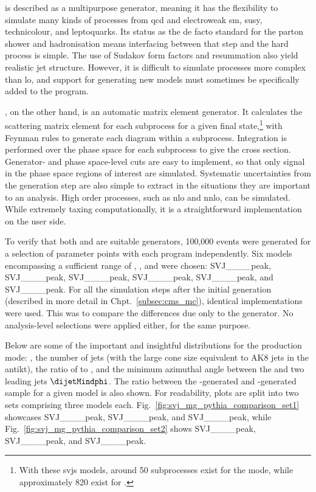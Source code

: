 
\PYTHIAEIGHT is described as a multipurpose generator, meaning it has the flexibility to simulate many kinds of processes from \acrshort{qcd} and electroweak \acrshort{sm}, \acrshort{susy}, technicolour, and leptoquarks. Its status as the de facto standard for the parton shower and hadronisation means interfacing between that step and the hard process is simple. The use of Sudakov form factors and resummation also yield realistic jet structure. However, it is difficult to simulate processes more complex than \acrshort{lo}, and support for generating new models must sometimes be specifically added to the program.

\MGvATNLO, on the other hand, is an automatic matrix element generator. It calculates the scattering matrix element for each subprocess for a given final state,\footnote{With these \glspl{svj} models, around 50 subprocesses exist for the \schannel mode, while approximately 820 exist for \tchannel.} with Feynman rules to generate each diagram within a subprocess. Integration is performed over the phase space for each subprocess to give the cross section. Generator- and phase space-level cuts are easy to implement, so that only signal in the phase space regions of interest are simulated. Systematic uncertainties from the generation step are also simple to extract in the situations they are important to an analysis. High order processes, such as \acrshort{nlo} and \acrshort{nnlo}, can be simulated. While extremely taxing computationally, it is a straightforward implementation on the user side.

To verify that both \PYTHIA and \MADGRAPH are suitable generators, 100,000 events were generated for a selection of parameter points with each program independently. Six models encompassing a sufficient range of \mZprime, \mDark, and \rinv were chosen: SVJ\_\_\_\_\-peak, SVJ\_\_\_\_peak, SVJ\_\_\_\_\-peak, SVJ\_\_\_\_\-peak, SVJ\_\_\_\_\-peak, and SVJ\_\_\_\_\-peak. For all the simulation steps after the initial generation (described in more detail in Chpt.~\ref{subsec:cms_mc}), identical implementations were used. This was to compare the differences due only to the generator. No analysis-level selections were applied either, for the same purpose.

Below are some of the important and insightful distributions for the \schannel production mode: \mT, the number of \glspl{jet} (with the large cone size equivalent to AK8 \glspl{jet} in the \gls{antikt}), the ratio of \ptmiss to \mT, and the minimum azimuthal angle between the \ptmiss and two leading \glspl{jet} $\dijetMindphi$. The ratio between the \MADGRAPH-generated and \PYTHIA-generated sample for a given model is also shown. For readability, plots are split into two sets comprising three models each. Fig.~\ref{fig:svj_mg_pythia_comparison_set1} showcases SVJ\_\_\_\_\-peak, SVJ\_\_\_\_\-peak, and SVJ\_\_\_\_\-peak, while Fig.~\ref{fig:svj_mg_pythia_comparison_set2} shows SVJ\_\_\_\_\-peak, SVJ\_\_\_\_\-peak, and SVJ\_\_\_\_\-peak.

